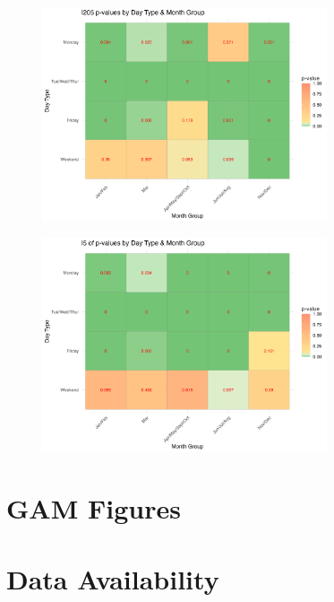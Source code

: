 \documentclass{article}
\begin{document}
\begin{figure}[H] 
    \centering
    \includegraphics[width=0.75\textwidth]{ATR26024_Plots/pvalues_A24.png}
    \label{fig:i205_pvalues}
\end{figure}

\begin{figure}[H] 
    \centering
    \includegraphics[width=0.75\textwidth]{ATR26004_Plots/pvalues_A04.png}
    \label{fig:i5_pvalues}
\end{figure}

\section{GAM Figures} \label{sec:gam_figs}



\section{Data Availability}
\end{document}
